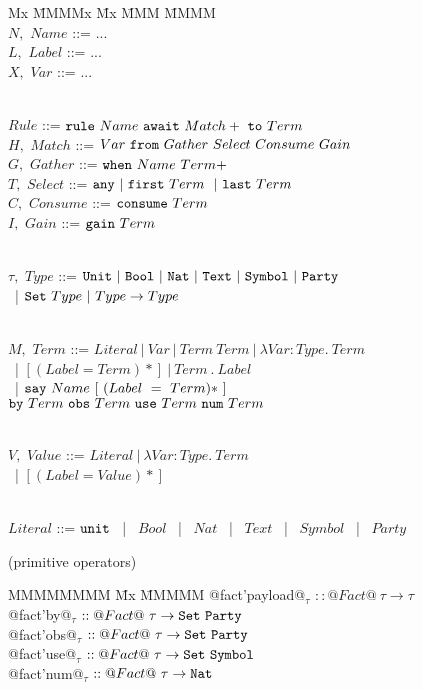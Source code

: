 \begin{figure}
\begin{tabbing}
Mx \= MMMMx \= Mx \= MMM \= MMMM \kill
\\ $N,$ \> $Name$       \> ::= \> ...
\\ $L,$ \> $Label$      \> ::= \> ...
\\ $X,$ \> $Var$        \> ::= \> ...

\\[1ex]
        \> $Rule$       \> ::= \> $\texttt{rule}~ Name~ \texttt{await}~ Match+~ \texttt{to}~ Term$
\\ $H,$ \> $Match$      \> ::= \> $Var~ \texttt{from}~ Gather~ Select~ Consume~ Gain$
\\ $G,$ \> $Gather$     \> ::= \> $\texttt{when}~ Name~ Term+$
\\ $T,$ \> $Select$     \> ::= \> $\texttt{any}~ |~ \texttt{first}~ Term~ ~|~ \texttt{last}~ Term$
\\ $C,$ \> $Consume$    \> ::= \> $\texttt{consume}~ Term$
\\ $I,$ \> $Gain$       \> ::= \> $\texttt{gain}~ Term$

\\[1ex]
   $\tau,$ \> $Type$    \> ::= \> $\texttt{Unit}~ |~ \texttt{Bool}~ |~ \texttt{Nat}~ |~ \texttt{Text}~ |~ \texttt{Symbol}~ |~ \texttt{Party}$
\\ \>                   \> ~|  \> $\texttt{Set}~ Type~ |~ Type \to Type$

\\[1ex]
  $M,$   \> $Term$      \> ::= \> $Literal~ |~ Var~ |~ Term~ Term~ |~ \lambda Var : Type.~ Term$
\\ \>                   \> ~|  \> $[ (Label = Term)* ]~ |~ Term~ .~ Label$
\\[0.5ex] \>            \> ~|  \> $\texttt{say}~ Name~ [~ (Label~ =~ Term)*~ ]~$
\\        \>            \>     \> \hspace{0.5em} $\texttt{by}~ Term~ \texttt{obs}~ Term~ \texttt{use}~ Term~ \texttt{num}~ Term$

\\[1ex]
  $V,$   \> $Value$     \> ::= \> $Literal~ |~ \lambda Var : Type.~ Term$
\\        \>            \> ~|  \> $[ (Label = Value)* ]$

\\[1ex]
 \> $Literal$           \> ::= \> $\texttt{unit}$ ~|~ $Bool$ ~|~ $Nat$ ~|~ $Text$ ~|~ $Symbol$ ~|~ $Party$
\end{tabbing}

\medskip
\begin{flushleft}
(primitive operators)
\end{flushleft}
\begin{tabbing}
MMMMMMMM \= Mx \= MMMMM \kill
   @fact'payload@$_\tau$ \> $:: @Fact@~ \tau \to \tau$
\\ @fact'by@$_\tau$     \> $:: @Fact@~ \tau \to \texttt{Set}~ \texttt{Party}$
\\ @fact'obs@$_\tau$    \> $:: @Fact@~ \tau \to \texttt{Set}~ \texttt{Party}$
\\ @fact'use@$_\tau$    \> $:: @Fact@~ \tau \to \texttt{Set}~ \texttt{Symbol}$
\\ @fact'num@$_\tau$    \> $:: @Fact@~ \tau \to \texttt{Nat}$
\end{tabbing}


\end{figure}
